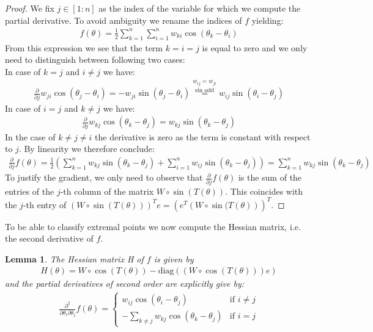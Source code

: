 \documentclass[12pt,a4paper]{article}
\theoremstyle{mythm}
\newtheorem{lem}[thm]{Lemma}
\begin{document}
\begin{proof}
We fix $ j \in \left[ 1:n \right] $ as the index of the variable for which we compute the partial derivative. To avoid ambiguity we rename the indices of $ f $ yielding:
\begin{align*}
f(\theta) = \frac{ 1 }{ 2 } \sum_{ k = 1 }^{ n } \sum_{ i = 1 }^{ n } w _{ ki } \cos( \theta_k - \theta_i ) 
\end{align*} 
From this expression we see that the term $ k=i=j $ is equal to zero and we only need to distinguish between following two cases: \\
In case of $ k = j $ and $ i \neq j  $ we have:
\begin{align*}
\frac{ \partial  }{ \partial j } w _{ ji } \cos( \theta _{ j } - \theta_i)  = -w _{ ji } \sin( \theta_j - \theta_i  ) 
\overset{ w _{ ij } = w _{ ji }  }{ \overset{ \sin \text{ odd}   }{ =}  } 
w _{ij} \sin( \theta_i - \theta_j) 
\end{align*} 
In case of $ i = j $ and $ k \neq j  $ we have:
\begin{align*}
\frac{ \partial  }{ \partial j } w _{ kj } \cos( \theta _{ k } - \theta_j)  = w _{ kj } \sin( \theta_k - \theta_j  ) 
\end{align*} 
In the case of $ k \neq j \neq i $ the derivative is zero as the term is constant with respect to $ j $. 
By linearity we therefore conclude:
\begin{align*}
\frac{ \partial  }{ \partial j } f(\theta) = \frac{ 1 }{ 2 } \left( \sum_{ k = 1 }^{ n } w _{ kj } \sin( \theta_k - \theta_j ) + \sum_{ i = 1 }^{ n } w _{ ij } \sin( \theta_k
- \theta_j )   \right) = \sum_{ k = 1 }^{ n } w _{ kj } \sin( \theta_k - \theta_j )
\end{align*} 
To justify the gradient, we only need to observe that $ \frac{ \partial  }{ \partial j } f(\theta) $ is the sum of the entries of the $ j $-th column of the matrix $ W \circ
\sin( T(\theta) )  $. This coincides with the $ j $-th entry of $ \left( W \circ \sin( T(\theta) )  \right) ^T e = \left( e^T \left( W \circ \sin( T (\theta )  \right)
\right)^T$.
\end{proof}
To be able to classify extremal points we now compute the Hessian matrix, i.e. the second derivative of $ f $.
\begin{lem}
The Hessian matrix H of $ f $ is given by 
\begin{align}
\label{def:Hessian} 
H(\theta) = W \circ \cos( T(\theta) ) - \text{diag} \left(  \left( W \circ \cos( T (\theta) ) \right) e  \right) 
\end{align} 
and the partial derivatives of second order are explicitly give by:
\begin{align*}
\frac{ \partial ^{ 2 }  }{ \partial \theta_i \partial \theta_j } f(\theta) = \begin{cases}
w _{ij} \cos( \theta_i - \theta_j )  & \text{if } i \neq j \\
- \sum_{ k \neq j  }^{ }w _{ kj } \cos( \theta_k - \theta_j )   & \text{if } i =j 
\end{cases}
\end{align*} 
\end{lem} 
\end{document}
